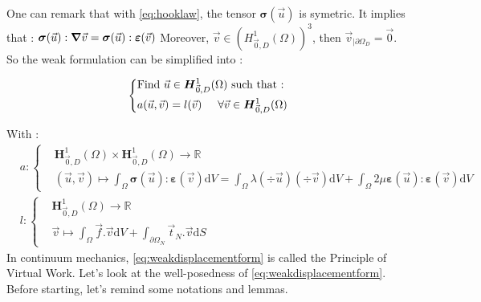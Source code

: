 \documentclass[a4paper,12pt,twoside]{report}
\newcommand{\mtr}{\mathbb{R}}
\newcommand{\dif}{\mathrm{d}}
\begin{document}
One can remark that with \eqref{eq:hooklaw}, the tensor $\boldsymbol \sigma (\vec u)$ is symetric. It implies that : 
$\boldsymbol \sigma (\vec u) : \grad \vec v = \boldsymbol \sigma(\vec u) : \boldsymbol \varepsilon (\vec v)$
Moreover, $\vec v \in \left(H^1_{\vec 0,D}(\Omega) \right)^3$, then $\vec v_{|\partial\Omega_D} = \vec 0$. So the weak formulation can be simplified into : 

\begin{tcolorbox}
\begin{equation}
\label{eq:weakdisplacementform}
\left\{
    \begin{aligned}
    &\text{Find } \vec u \in \boldsymbol H^1_{\vec 0,D}(\Omega) \text{ such that :}\\
    & a(\vec u,\vec v) = l(\vec v) \hspace{0.5cm} \forall \vec v \in \boldsymbol H^1_{\vec 0,D}(\Omega)
    \end{aligned}
\right.
\end{equation}
\end{tcolorbox}




With : 
\begin{equation*}
    \begin{aligned}
        & a : \left\{
        \begin{aligned}
            &\boldsymbol H^1_{\vec 0,D}(\Omega) \times \boldsymbol H^1_{\vec 0,D}(\Omega)  \rightarrow \mtr \\
            &(\vec u,\vec v)  \longmapsto \int_\Omega \boldsymbol \sigma(\vec u) : \boldsymbol \varepsilon (\vec v) \dif V = \int_\Omega \lambda (\div \vec u) (\div \vec v) \dif V+ \int_\Omega 2\mu \boldsymbol \varepsilon(\vec u): \boldsymbol \varepsilon (\vec v)\dif V
        \end{aligned}
        \right. \\
    	& l : \left\{
        \begin{aligned}
            &\boldsymbol H^1_{\vec 0,D}(\Omega) \rightarrow \mtr \\
            &\vec v \longmapsto \int_\Omega \vec f . \vec v \dif V + \int_{\partial\Omega_N} \vec t_N.\vec v \dif S
        \end{aligned}
        \right.
    \end{aligned}
\end{equation*}
In continuum mechanics, \eqref{eq:weakdisplacementform} is called the Principle of Virtual Work. Let's look at the well-posedness of \eqref{eq:weakdisplacementform}. Before starting, let's remind some notations and lemmas. \\
\end{document}
